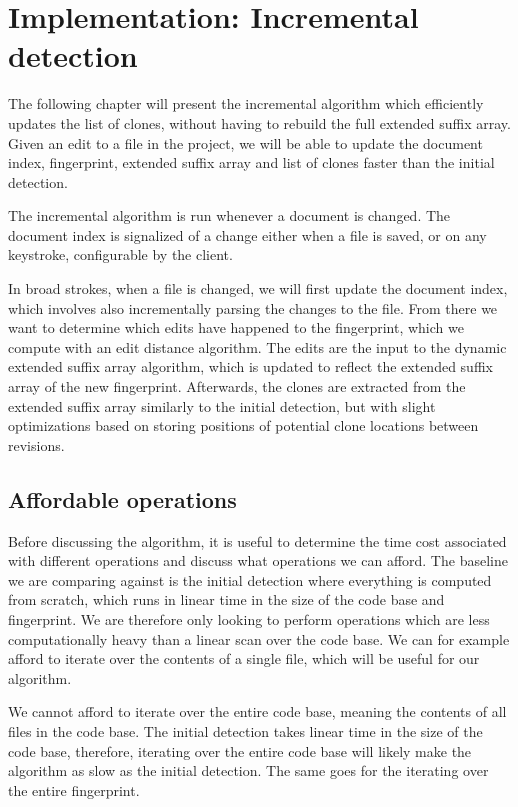 \chapter{Implementation: Incremental detection}
\label{dynamicdetection}

The following chapter will present the incremental algorithm which efficiently updates the
list of clones, without having to rebuild the full extended suffix array. Given an edit to
a file in the project, we will be able to update the document index, fingerprint, extended
suffix array and list of clones faster than the initial detection.

The incremental algorithm is run whenever a document is changed. The document index is
signalized of a change either when a file is saved, or on any keystroke, configurable by
the client. 

In broad strokes, when a file is changed, we will first update the document index, which
involves also incrementally parsing the changes to the file. From there we want to
determine which edits have happened to the fingerprint, which we compute with an edit
distance algorithm. The edits are the input to the dynamic extended suffix array
algorithm, which is updated to reflect the extended suffix array of the new fingerprint.
Afterwards, the clones are extracted from the extended suffix array similarly to the
initial detection, but with slight optimizations based on storing positions of potential
clone locations between revisions.

\section{Affordable operations}

Before discussing the algorithm, it is useful to determine the time cost associated with
different operations and discuss what operations we can afford. The baseline we are
comparing against is the initial detection where everything is computed from scratch,
which runs in linear time in the size of the code base and fingerprint. We are therefore
only looking to perform operations which are less computationally heavy than a linear scan
over the code base. We can for example afford to iterate over the contents of a single
file, which will be useful for our algorithm. 

We cannot afford to iterate over the entire code base, meaning the contents of all files
in the code base. The initial detection takes linear time in the size of the code base,
therefore, iterating over the entire code base will likely make the algorithm as slow as
the initial detection. The same goes for the iterating over the entire fingerprint.

